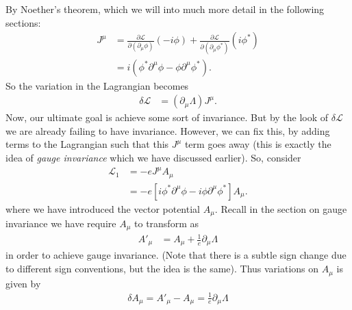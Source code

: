 \documentclass{book}
\numberwithin{equation}{section}
\theoremstyle{definition}
\newcommand{\p}{\partial}
\newcommand{\lag}{\mathcal{L}}
\begin{document}
By Noether's theorem, which we will into much more detail in the following sections:
\begin{align}
J^\mu &= \frac{\p\lag}{\p(\p_\mu\phi)}(-i\phi) + \frac{\p\lag}{\p(\p_\mu\phi^*)}(i\phi^*)\\
&= i(\phi^*\p^\mu\phi - \phi\p^\mu\phi^*).
\end{align}
So the variation in the Lagrangian becomes
\begin{align}
\delta \lag &= (\p_\mu\Lambda)J^\mu. 
\end{align}
Now, our ultimate goal is achieve some sort of invariance. But by the look of $\delta \lag$ we are already failing to have invariance. However, we can fix this, by adding terms to the Lagrangian such that this $J^\mu$ term goes away (this is exactly the idea of \textit{gauge invariance} which we have discussed earlier). So, consider
\begin{align}
\lag_1 &= -eJ^\mu A_\mu\\
&= -e[i\phi^*\p^\mu\phi - i\phi\p^\mu\phi^*]A_\mu.
\end{align}
where we have introduced the vector potential $A_\mu$. Recall in the section on gauge invariance we have require $A_\mu$ to transform as
\begin{align}
A'_\mu&= A_\mu + \frac{1}{e}\p_\mu\Lambda
\end{align}
in order to achieve gauge invariance. (Note that there is a subtle sign change due to different sign conventions, but the idea is the same). Thus variations on $A_\mu$ is given by
\begin{align}
\delta A_\mu = A'_\mu - A_\mu = \frac{1}{e}\p_\mu\Lambda
\end{align}
\end{document}
